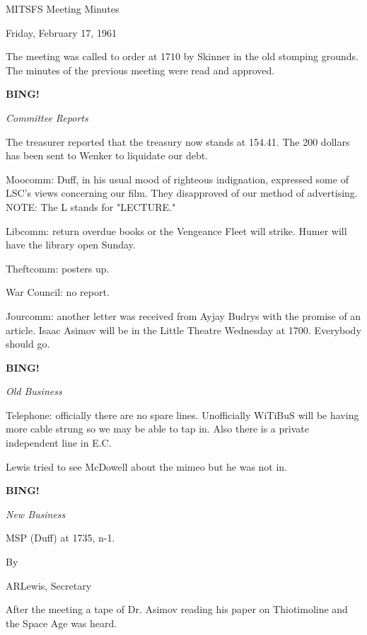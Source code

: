 \documentclass[12pt]{article}
\newcommand{\bing}{{\bf BING!} }
\newcommand{\goto}[1]{\bing \vskip 12pt \centerline{{\em{#1}}}}
\begin{document}
\begin{center}

MITSFS Meeting Minutes

Friday, February 17, 1961

\end{center}
 
\vspace{12pt}

\setlength{\parskip}{6pt}

\noindent
The meeting was called to order at 1710 by Skinner in the old stomping grounds. The minutes of the previous meeting were read and approved.

\goto{Committee Reports}

The treasurer reported that the treasury now stands at 154.41. The 200 dollars has been sent to Wenker to liquidate our debt.

Moocomm: Duff, in his usual mood of righteous indignation, expressed some of LSC's views concerning our film. They disapproved of our method of advertising. NOTE: The L stands for "LECTURE."

Libcomm: return overdue books or the Vengeance Fleet will strike. Humer will have the library open Sunday.

Theftcomm: posters up.

War Council: no report.

Jourcomm: another letter was received from Ayjay Budrys with the promise of an article. Isaac Asimov will be in the Little Theatre Wednesday at 1700. Everybody should go.

\goto{Old Business}

Telephone: officially there are no spare lines. Unofficially WiTiBuS will be having more cable strung so we may be able to tap in. Also there is a private independent line in E.C.

Lewis tried to see McDowell about the mimeo but he was not in.

\goto{New Business}

MSP (Duff) at 1735, n-1.

\vspace{12pt}

\centerline{By}
\centerline{ARLewis, Secretary}

After the meeting a tape of Dr. Asimov reading his paper on Thiotimoline and the Space Age was heard.
\end{document}
